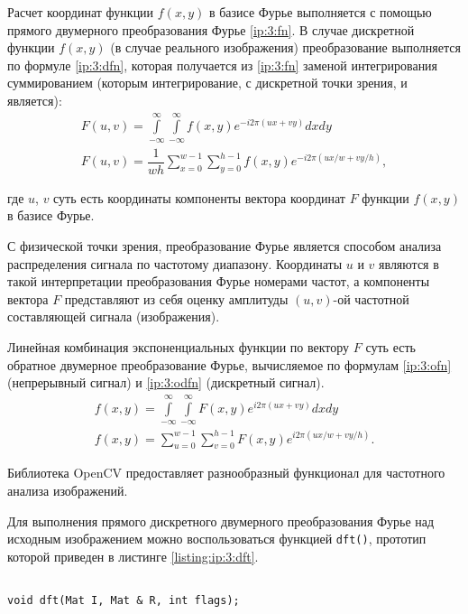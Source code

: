 Расчет координат функции $f(x, y)$ в базисе Фурье выполняется с помощью прямого двумерного преобразования Фурье \eqref{ip:3:fn}. В случае дискретной функции $f(x, y)$ (в случае реального изображения) преобразование выполняется по формуле \eqref{ip:3:dfn}, которая получается из \eqref{ip:3:fn} заменой интегрирования суммированием (которым интегрирование, с дискретной точки зрения, и является):
\begin{gather}
	\label{ip:3:fn} F(u, v) = \int\limits_{- \infty}^{\infty} \int\limits_{- \infty}^{\infty} f(x, y) e^{-i 2 \pi (ux + vy)} dx dy \\
	\label{ip:3:dfn} F(u, v) = \dfrac{1}{wh} \sum\limits_{x = 0}^{w - 1} \sum\limits_{y = 0}^{h - 1} f(x, y) e^{-i 2 \pi (ux / w + vy / h)},
\end{gather}

где $u$, $v$ суть есть координаты компоненты вектора координат $F$ функции $f(x, y)$ в базисе Фурье.

С физической точки зрения, преобразование Фурье является способом анализа распределения сигнала по частотому диапазону. Координаты $u$ и $v$ являются в такой интерпретации преобразования Фурье номерами частот, а компоненты вектора $F$ представляют из себя оценку амплитуды $(u, v)$-ой частотной составляющей сигнала (изображения).

Линейная комбинация экспоненциальных функции по вектору $F$ суть есть обратное двумерное преобразование Фурье, вычисляемое по формулам \eqref{ip:3:ofn} (непрерывный сигнал) и \eqref{ip:3:odfn} (дискретный сигнал).
\begin{gather}
	\label{ip:3:ofn} f(x, y) = \int\limits_{- \infty}^{\infty} \int\limits_{- \infty}^{\infty} F(x, y) e ^{i 2 \pi (ux + vy)} dx dy \\
	\label{ip:3:odfn} f(x, y) = \sum\limits_{u = 0}^{w - 1} \sum\limits_{v = 0}^{h - 1} F(x, y) e ^{i 2 \pi (ux / w + vy / h)}.
\end{gather}

Библиотека OpenCV предоставляет разнообразный функционал для частотного анализа изображений.

Для выполнения прямого дискретного двумерного преобразования Фурье над исходным изображением можно воспользоваться функцией \verb|dft()|, прототип которой приведен в листинге \ref{listing:ip:3:dft}.

\begin{lstlisting}

void dft(Mat I, Mat & R, int flags);

\end{lstlisting}
\mylistingend

